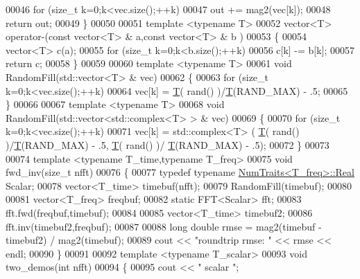 \begin{DoxyCode}
00046     \textcolor{keywordflow}{for} (\textcolor{keywordtype}{size\_t} k=0;k<vec.size();++k)
00047         out += mag2(vec[k]);
00048     \textcolor{keywordflow}{return} out;
00049 \}
00050 
00051 \textcolor{keyword}{template} <\textcolor{keyword}{typename} T>
00052 vector<T> operator-(\textcolor{keyword}{const} vector<T> & a,\textcolor{keyword}{const} vector<T> & b )
00053 \{
00054     vector<T> c(a);
00055     \textcolor{keywordflow}{for} (\textcolor{keywordtype}{size\_t} k=0;k<b.size();++k) 
00056         c[k] -= b[k];
00057     \textcolor{keywordflow}{return} c;
00058 \}
00059 
00060 \textcolor{keyword}{template} <\textcolor{keyword}{typename} T>
00061 \textcolor{keywordtype}{void} RandomFill(std::vector<T> & vec)
00062 \{
00063     \textcolor{keywordflow}{for} (\textcolor{keywordtype}{size\_t} k=0;k<vec.size();++k)
00064         vec[k] = \hyperlink{group___sparse_core___module}{T}( rand() )/\hyperlink{group___sparse_core___module}{T}(RAND\_MAX) - .5;
00065 \}
00066 
00067 \textcolor{keyword}{template} <\textcolor{keyword}{typename} T>
00068 \textcolor{keywordtype}{void} RandomFill(std::vector<std::complex<T> > & vec)
00069 \{
00070     \textcolor{keywordflow}{for} (\textcolor{keywordtype}{size\_t} k=0;k<vec.size();++k)
00071         vec[k] = std::complex<T> ( \hyperlink{group___sparse_core___module}{T}( rand() )/\hyperlink{group___sparse_core___module}{T}(RAND\_MAX) - .5, \hyperlink{group___sparse_core___module}{T}( rand() )/
      \hyperlink{group___sparse_core___module}{T}(RAND\_MAX) - .5);
00072 \}
00073 
00074 \textcolor{keyword}{template} <\textcolor{keyword}{typename} T\_time,\textcolor{keyword}{typename} T\_freq>
00075 \textcolor{keywordtype}{void} fwd\_inv(\textcolor{keywordtype}{size\_t} nfft)
00076 \{
00077     \textcolor{keyword}{typedef} \textcolor{keyword}{typename} \hyperlink{group___core___module_struct_eigen_1_1_num_traits}{NumTraits<T\_freq>::Real} Scalar;
00078     vector<T\_time> timebuf(nfft);
00079     RandomFill(timebuf);
00080 
00081     vector<T\_freq> freqbuf;
00082     \textcolor{keyword}{static} FFT<Scalar> fft;
00083     fft.fwd(freqbuf,timebuf);
00084 
00085     vector<T\_time> timebuf2;
00086     fft.inv(timebuf2,freqbuf);
00087 
00088     \textcolor{keywordtype}{long} \textcolor{keywordtype}{double} rmse = mag2(timebuf - timebuf2) / mag2(timebuf);
00089     cout << \textcolor{stringliteral}{"roundtrip rmse: "} << rmse << endl;
00090 \}
00091 
00092 \textcolor{keyword}{template} <\textcolor{keyword}{typename} T\_scalar>
00093 \textcolor{keywordtype}{void} two\_demos(\textcolor{keywordtype}{int} nfft)
00094 \{
00095     cout << \textcolor{stringliteral}{"     scalar "};

\end{DoxyCode}
